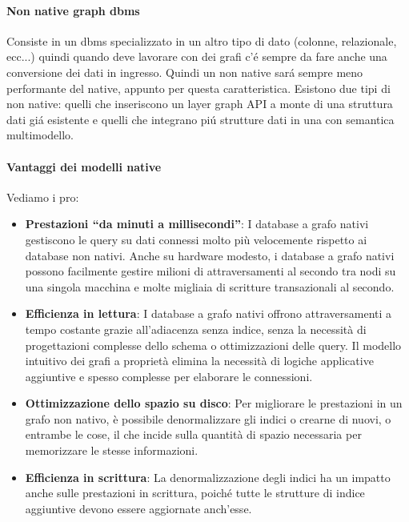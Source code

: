 \paragraph{Non native graph dbms} Consiste in un dbms specializzato in un altro tipo di dato (colonne, relazionale, ecc...) quindi quando deve lavorare con dei grafi c'é sempre da fare anche una conversione dei dati in ingresso. Quindi un non native sará sempre meno performante del native, appunto per questa caratteristica. Esistono due tipi di non native: quelli che inseriscono un layer graph API a monte di una struttura dati giá esistente e quelli che integrano piú strutture dati in una con semantica multimodello.

\paragraph{Vantaggi dei modelli native} Vediamo i pro:
\begin{itemize}
  \item \textbf{Prestazioni “da minuti a millisecondi”}: I database a grafo nativi gestiscono le query su dati connessi molto più velocemente rispetto ai database non nativi. Anche su hardware modesto, i database a grafo nativi possono facilmente gestire milioni di attraversamenti al secondo tra nodi su una singola macchina e molte migliaia di scritture transazionali al secondo.
  
  \item \textbf{Efficienza in lettura}: I database a grafo nativi offrono attraversamenti a tempo costante grazie all’adiacenza senza indice, senza la necessità di progettazioni complesse dello schema o ottimizzazioni delle query. Il modello intuitivo dei grafi a proprietà elimina la necessità di logiche applicative aggiuntive e spesso complesse per elaborare le connessioni.
  
  \item \textbf{Ottimizzazione dello spazio su disco}: Per migliorare le prestazioni in un grafo non nativo, è possibile denormalizzare gli indici o crearne di nuovi, o entrambe le cose, il che incide sulla quantità di spazio necessaria per memorizzare le stesse informazioni.
  
  \item \textbf{Efficienza in scrittura}: La denormalizzazione degli indici ha un impatto anche sulle prestazioni in scrittura, poiché tutte le strutture di indice aggiuntive devono essere aggiornate anch’esse.
\end{itemize}

